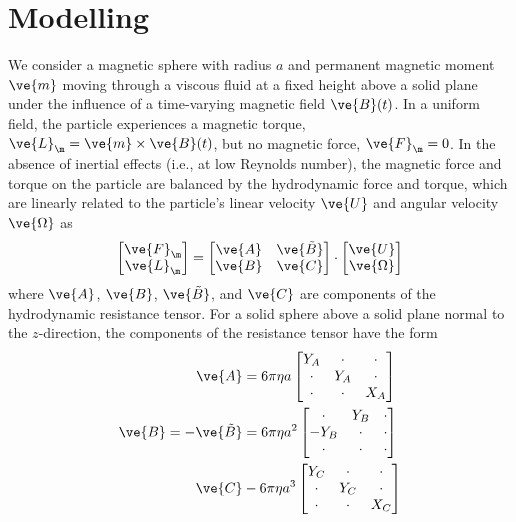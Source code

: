 \section{Modelling }
We consider a magnetic sphere with radius $a$ and permanent magnetic moment $\ve{m}$ moving through a viscous fluid at a fixed height above a solid plane under the influence of a time-varying magnetic field $\ve{B}(t)$. In a uniform field, the particle experiences a magnetic torque, $\ve{L}_{\m}=\ve{m}\times\ve{B}(t)$, but no magnetic force, $\ve{F}_{\m}=0$. In the absence of inertial effects (i.e., at low Reynolds number), the magnetic force and torque on the particle are balanced by the hydrodynamic force and torque, which are linearly related to the particle's linear velocity $\ve{U}$ and angular velocity $\ve{\Omega}$ as
\begin{equation}
    \begin{bmatrix} \ve{F}_{\m} \\ \ve{L}_{\m} \end{bmatrix} = \begin{bmatrix} \ve{A} & \ve{\tilde{B}} \\ \ve{B} & \ve{C} \end{bmatrix}  \cdot \begin{bmatrix} \ve{U} \\ \ve{\Omega} \end{bmatrix} \label{eq:dynamics}
\end{equation}
where $\ve{A}$, $\ve{B}$, $\ve{\tilde{B}}$, and $\ve{C}$ are components of the hydrodynamic resistance tensor.  For a solid sphere above a solid plane normal to the $z$-direction, the components of the resistance tensor have the form
\begin{align}
    \ve{A} &=  6\pi \eta a \begin{bmatrix} 
        Y_A & \cdot & \cdot \\
        \cdot & Y_A & \cdot \\
        \cdot & \cdot & X_A  \end{bmatrix}
    \\
    \ve{B}=-\ve{\tilde{B}}&= 6\pi \eta a^2 \begin{bmatrix} 
        \cdot & Y_B & \cdot \\
        -Y_B & \cdot & \cdot \\
        \cdot & \cdot & \cdot  \end{bmatrix}
    \\
    \ve{C} &- 6\pi \eta a^3 \begin{bmatrix} 
        Y_C & \cdot & \cdot \\
        \cdot & Y_C & \cdot \\
        \cdot & \cdot & X_C  \end{bmatrix} 
\end{align}
